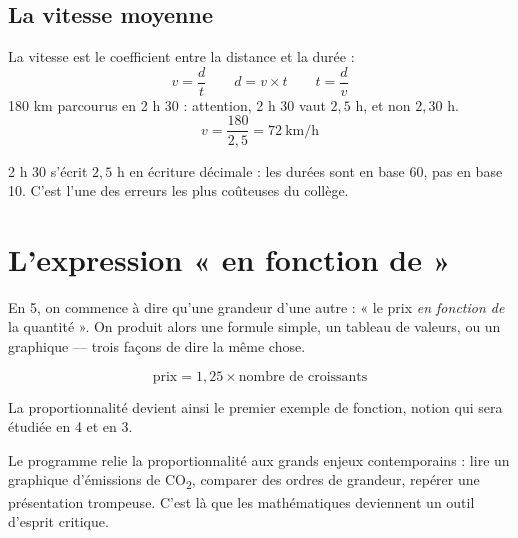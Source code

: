 \documentclass{fiche}
\begin{document}
\subsection{\niv{5\ieme} La vitesse moyenne}
La vitesse est le coefficient entre la distance et la durée :
\[v = \frac{d}{t} \qquad d = v\times t \qquad t = \frac{d}{v}\]
180 km parcourus en 2 h 30 : attention, 2 h 30 vaut $2{,}5$ h, et non $2{,}30$ h.
\[v = \frac{180}{2{,}5} = 72\ \text{km/h}\]

\begin{piege}
2 h 30 s'écrit $2{,}5$ h en écriture décimale : les durées sont en base 60,
pas en base 10. C'est l'une des erreurs les plus coûteuses du collège.
\end{piege}

\section{\niv{5\ieme} L'expression « en fonction de »}

En 5\ieme{}, on commence à dire qu'une grandeur  d'une autre :
« le prix \emph{en fonction de} la quantité ». On produit alors une formule simple,
un tableau de valeurs, ou un graphique — trois façons de dire la même chose.

\[\text{prix} = 1{,}25 \times \text{nombre de croissants}\]

La proportionnalité devient ainsi le premier exemple de fonction, notion qui sera
étudiée en 4\ieme{} et en 3\ieme{}.

\begin{prolongement}
Le programme relie la proportionnalité aux grands enjeux contemporains :
lire un graphique d'émissions de CO\textsubscript{2}, comparer des ordres de
grandeur, repérer une présentation trompeuse. C'est là que les mathématiques
deviennent un outil d'esprit critique.
\end{prolongement}

\begin{videos}
\end{videos}
\end{document}
